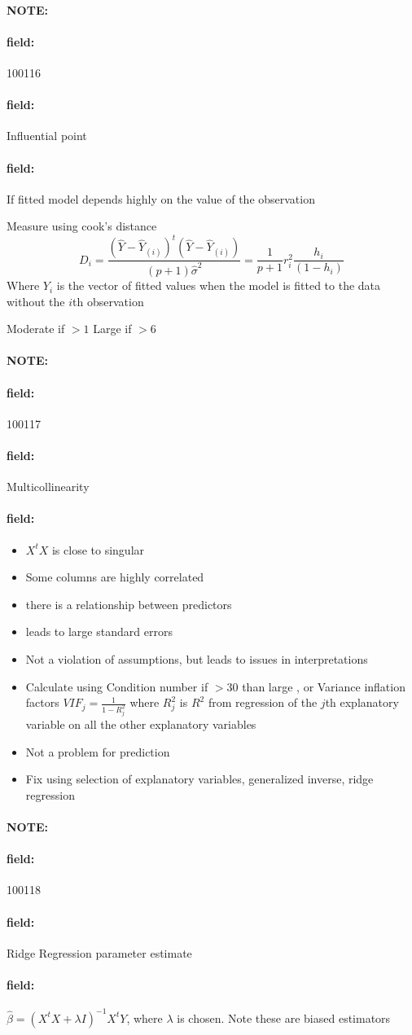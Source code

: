 \documentclass[12pt]{article}
\newenvironment{note}{\paragraph{NOTE:}}{}
\newenvironment{field}{\paragraph{field:}}{}
\begin{document}
\begin{note} \begin{field} \tiny 100116 \end{field}
 \begin{field}
  Influential point
 \end{field}
 \begin{field}
    If fitted model depends highly on the value of the observation

  Measure using cook's distance
  $$ D_i = \frac{(\hat{Y} - \hat{Y}_{(i)})^t(\hat{Y} - \hat{Y}_{(i)})}{(p+1)\hat{\sigma}^2} = \frac{1}{p+1}r_i^2 \frac{h_i}{(1 - h_i)}$$
  Where $Y_{i}$ is the vector of fitted values when the model is fitted to the data without the $i$th observation

   Moderate if $>1 $ Large if $>6$
 \end{field}
\end{note}


\begin{note} \begin{field} \tiny 100117 \end{field}
 \begin{field}
  Multicollinearity
 \end{field}
 \begin{field}
  \begin{itemize}
   \item $X^tX$ is close to singular
   \item Some columns are highly correlated
   \item there is a relationship between predictors \item leads to large standard errors
   \item Not a violation of assumptions, but leads to issues in interpretations
   \item Calculate using Condition number if $>30$ than large , or Variance inflation factors $VIF_j = \frac{1}{1 - R^2_j}$ where $R^2_j$ is $R^2$ from regression of the $j$th explanatory variable on all the other explanatory variables
   \item Not a problem for prediction
   \item Fix using selection of explanatory variables, generalized inverse, ridge regression
  \end{itemize}
 \end{field}
\end{note}

\begin{note} \begin{field} \tiny 100118 \end{field}
 \begin{field}
  Ridge Regression parameter estimate
 \end{field}
 \begin{field}
  $\hat{\beta} = (X^tX + \lambda I)^{-1} X^t Y$, where $\lambda$ is chosen. Note these are biased estimators
 \end{field}
\end{note}
\end{document}
